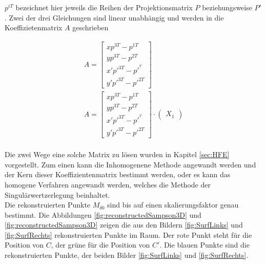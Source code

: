$p^{iT}$ bezeichnet hier jeweils die Reihen der Projektionsmatrix $P$ beziehungsweise $P'$. Zwei der drei Gleichungen sind linear unabhängig und werden in die Koeffizietenmatrix $A$ geschrieben 



\begin{gather}
A = \begin{bmatrix}
xp^{3T}-p^{1T}\\
yp^{3T}-p^{2T}\\
x'p'^{3T}-p'^{^T}\\
y'p'^{3T}-p'^{2T}
\end{bmatrix}\\
A = \begin{bmatrix}
	xp^{3T}-p^{1T}\\
	yp^{3T}-p^{2T}\\
	x'p'^{3T}-p'^{^T}\\
	y'p'^{3T}-p'^{2T}
\end{bmatrix} \cdot
\begin{pmatrix}
	X_1
\end{pmatrix}
\end{gather}\\

Die zwei Wege eine solche Matrix zu lösen wurden in Kapitel \ref{sec:HFE} vorgestellt. Zum einen kann die Inhomogenene Methode angewandt werden und der Kern dieser Koeffizientenmatrix bestimmt werden, oder es kann das homogene Verfahren angewandt werden, welches die Methode der Singulärwertzerlegung beinhaltet. \\

Die rekonstruierten Punkte $M_{\delta 0}$ sind bis auf einen skalierungsfaktor genau bestimmt.
Die Abbildungen \ref{fig:reconstructedSampson3D} und \ref{fig:reconstructedSampson3D} zeigen die aus den Bildern \ref{fig:SurfLinks} und \ref{fig:SurfRechts} rekonstruierten Punkte im Raum. Der rote Punkt steht für die Position von $C$, der grüne für die Position von $C'$. Die blauen Punkte sind die rekonstruierten Punkte, der beiden Bilder \ref{fig:SurfLinks} und \ref{fig:SurfRechts}. 

%
%

